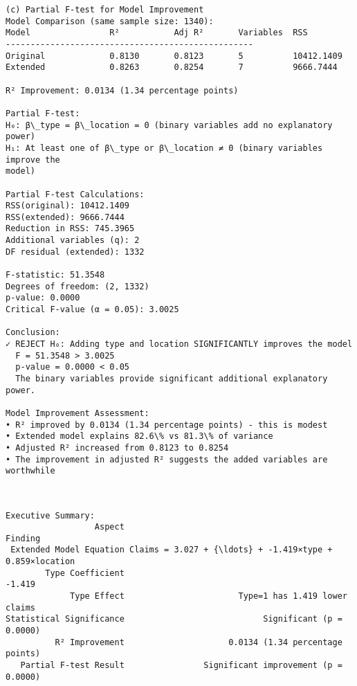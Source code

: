 \documentclass[8pt, twocolumn]{extarticle}
\begin{document}
    \begin{Verbatim}[commandchars=\\\{\}]
(c) Partial F-test for Model Improvement
Model Comparison (same sample size: 1340):
Model                R²           Adj R²       Variables  RSS
--------------------------------------------------
Original             0.8130       0.8123       5          10412.1409
Extended             0.8263       0.8254       7          9666.7444

R² Improvement: 0.0134 (1.34 percentage points)

Partial F-test:
H₀: β\_type = β\_location = 0 (binary variables add no explanatory power)
H₁: At least one of β\_type or β\_location ≠ 0 (binary variables improve the
model)

Partial F-test Calculations:
RSS(original): 10412.1409
RSS(extended): 9666.7444
Reduction in RSS: 745.3965
Additional variables (q): 2
DF residual (extended): 1332

F-statistic: 51.3548
Degrees of freedom: (2, 1332)
p-value: 0.0000
Critical F-value (α = 0.05): 3.0025

Conclusion:
✓ REJECT H₀: Adding type and location SIGNIFICANTLY improves the model
  F = 51.3548 > 3.0025
  p-value = 0.0000 < 0.05
  The binary variables provide significant additional explanatory power.

Model Improvement Assessment:
• R² improved by 0.0134 (1.34 percentage points) - this is modest
• Extended model explains 82.6\% vs 81.3\% of variance
• Adjusted R² increased from 0.8123 to 0.8254
• The improvement in adjusted R² suggests the added variables are worthwhile
    \end{Verbatim}
    \begin{center}
    \end{center}
    { \hspace*{\fill} \\}
    \begin{Verbatim}[commandchars=\\\{\}]
Executive Summary:
                  Aspect                                             Finding
 Extended Model Equation Claims = 3.027 + {\ldots} + -1.419×type + 0.859×location
        Type Coefficient                                              -1.419
             Type Effect                       Type=1 has 1.419 lower claims
Statistical Significance                            Significant (p = 0.0000)
          R² Improvement                     0.0134 (1.34 percentage points)
   Partial F-test Result                Significant improvement (p = 0.0000)
    \end{Verbatim}
\end{document}
